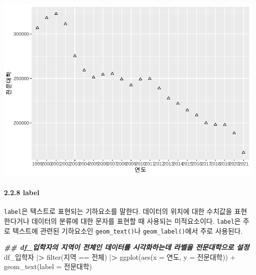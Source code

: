 \documentclass[
]{article}
\newenvironment{Shaded}{\begin{snugshade}}{\end{snugshade}}
\newcommand{\AttributeTok}[1]{\textcolor[rgb]{0.77,0.63,0.00}{#1}}
\newcommand{\DocumentationTok}[1]{\textcolor[rgb]{0.56,0.35,0.01}{\textbf{\textit{#1}}}}
\newcommand{\ErrorTok}[1]{\textcolor[rgb]{0.64,0.00,0.00}{\textbf{#1}}}
\newcommand{\FunctionTok}[1]{\textcolor[rgb]{0.00,0.00,0.00}{#1}}
\newcommand{\NormalTok}[1]{#1}
\newcommand{\SpecialCharTok}[1]{\textcolor[rgb]{0.00,0.00,0.00}{#1}}
\newcommand{\StringTok}[1]{\textcolor[rgb]{0.31,0.60,0.02}{#1}}
\begin{document}
\includegraphics{chap3_files/figure-latex/unnamed-chunk-15-2.pdf}

\hypertarget{label}{%
\paragraph{2.2.8 label}\label{label}}

\texttt{label}은 텍스트로 표현되는 기하요소를 말한다. 데이터의 위치에 대한 수치값을 표현한다거나 데이터의 분류에 대한 문자를 표현할 때 사용되는 미적요소이다. \texttt{label}은 주로 텍스트에 관련된 기하요소인 \texttt{geom\_text()}나 \texttt{geom\_label()}에서 주로 사용된다.

\begin{Shaded}
\begin{Highlighting}[]
\DocumentationTok{\#\# df\_입학자의 지역이 \textquotesingle{}전체\textquotesingle{}인 데이터를 시각화하는데 라벨을 \textquotesingle{}전문대학\textquotesingle{}으로 설정}
\NormalTok{df\_입학자 }\SpecialCharTok{|}\ErrorTok{\textgreater{}} \FunctionTok{filter}\NormalTok{(지역 }\SpecialCharTok{==} \StringTok{\textquotesingle{}전체\textquotesingle{}}\NormalTok{) }\SpecialCharTok{|}\ErrorTok{\textgreater{}}
  \FunctionTok{ggplot}\NormalTok{(}\FunctionTok{aes}\NormalTok{(}\AttributeTok{x =}\NormalTok{ 연도, }\AttributeTok{y =}\NormalTok{ 전문대학)) }\SpecialCharTok{+}
  \FunctionTok{geom\_text}\NormalTok{(}\AttributeTok{label =} \StringTok{\textquotesingle{}전문대학\textquotesingle{}}\NormalTok{)}
\end{Highlighting}
\end{Shaded}
\end{document}
